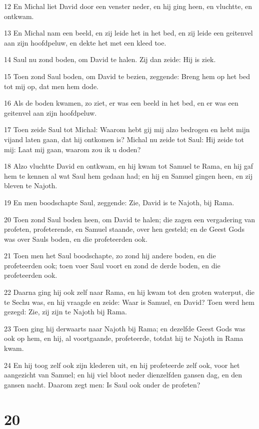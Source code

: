 \par 12 En Michal liet David door een venster neder, en hij ging heen, en vluchtte, en ontkwam.
\par 13 En Michal nam een beeld, en zij leide het in het bed, en zij leide een geitenvel aan zijn hoofdpeluw, en dekte het met een kleed toe.
\par 14 Saul nu zond boden, om David te halen. Zij dan zeide: Hij is ziek.
\par 15 Toen zond Saul boden, om David te bezien, zeggende: Breng hem op het bed tot mij op, dat men hem dode.
\par 16 Als de boden kwamen, zo ziet, er was een beeld in het bed, en er was een geitenvel aan zijn hoofdpeluw.
\par 17 Toen zeide Saul tot Michal: Waarom hebt gij mij alzo bedrogen en hebt mijn vijand laten gaan, dat hij ontkomen is? Michal nu zeide tot Saul: Hij zeide tot mij: Laat mij gaan, waarom zou ik u doden?
\par 18 Alzo vluchtte David en ontkwam, en hij kwam tot Samuel te Rama, en hij gaf hem te kennen al wat Saul hem gedaan had; en hij en Samuel gingen heen, en zij bleven te Najoth.
\par 19 En men boodschapte Saul, zeggende: Zie, David is te Najoth, bij Rama.
\par 20 Toen zond Saul boden heen, om David te halen; die zagen een vergadering van profeten, profeterende, en Samuel staande, over hen gesteld; en de Geest Gods was over Sauls boden, en die profeteerden ook.
\par 21 Toen men het Saul boodschapte, zo zond hij andere boden, en die profeteerden ook; toen voer Saul voort en zond de derde boden, en die profeteerden ook.
\par 22 Daarna ging hij ook zelf naar Rama, en hij kwam tot den groten waterput, die te Sechu was, en hij vraagde en zeide: Waar is Samuel, en David? Toen werd hem gezegd: Zie, zij zijn te Najoth bij Rama.
\par 23 Toen ging hij derwaarts naar Najoth bij Rama; en dezelfde Geest Gods was ook op hem, en hij, al voortgaande, profeteerde, totdat hij te Najoth in Rama kwam.
\par 24 En hij toog zelf ook zijn klederen uit, en hij profeteerde zelf ook, voor het aangezicht van Samuel; en hij viel bloot neder dienzelfden gansen dag, en den gansen nacht. Daarom zegt men: Is Saul ook onder de profeten?

\chapter{20}

